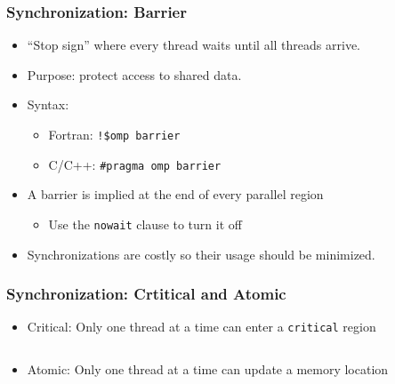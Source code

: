 \documentclass[c,mathserif,compress,xcolor=svgnames]{beamer}
\newenvironment{eblock}[0]
{
\begin{beamerboxesrounded}[upper=uppercol2,lower=lowercol2,shadow=true]}
{\end{beamerboxesrounded}}
\begin{document}
\begin{frame}
  \frametitle{\small Synchronization: Barrier}
  \begin{itemize}
    \item ``Stop sign'' where every thread waits until all threads arrive.
    \item Purpose: protect access to shared data.
    \item Syntax:
    \begin{itemize}
      \item Fortran: \texttt{!\$omp barrier}
      \item C/C++: \texttt{\#pragma omp barrier}
    \end{itemize}
    \item A barrier is implied at the end of every parallel region
    \begin{itemize}
      \item Use the \texttt{nowait} clause to turn it off
    \end{itemize}
    \item Synchronizations are costly so their usage should be minimized.
  \end{itemize}
\end{frame}

\begin{frame}
  \frametitle{\small Synchronization: Crtitical and Atomic}
  \begin{itemize}
    \item Critical: Only one thread at a time can enter a \texttt{critical} region 
  \end{itemize}
  \begin{columns}
    \begin{eblock}{}
      
    \end{eblock}
  \end{columns}
  \begin{itemize}
    \item Atomic: Only one thread at a time can update a memory location 
  \end{itemize}
  \begin{columns}
    \begin{eblock}{}
      
    \end{eblock}  
  \end{columns}
\end{frame}
\end{document}
